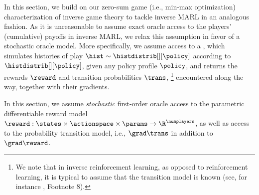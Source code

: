 In this section, we build on our zero-sum game (i.e., min-max optimization) characterization of inverse game theory to tackle inverse MARL in an analogous fashion.
As it is unreasonable to assume exact oracle access to the players' (cumulative) payoffs in inverse MARL, we relax this assumption
in favor of a stochastic oracle model.
More specifically, we assume access to a  \citep{suh2022differentiable}, which simulates histories of play $\hist \sim \histdistrib[][\policy]$ according to $\histdistrib[][\policy]$, given any policy profile $\policy$, and returns the rewards $\reward$ and transition probabilities $\trans$,%
\footnote{We note that in inverse reinforcement learning, as opposed to reinforcement learning, it is typical to assume that the transition model is known (see, for instance \citep{abbeel2004apprenticeship}, Footnote 8).} 
encountered along the way, together with their gradients.




In this section, we assume \emph{stochastic\/} first-order oracle access to the parametric differentiable reward model $\reward: \states \times \actionspace \times \params \to \R^\numplayers$, as well as  access to the probability transition model, i.e., $\grad \trans$ in addition to $\grad \reward$.
\fi

